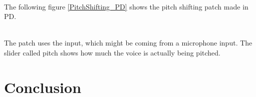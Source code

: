 \begin{minipage}{\linewidth}%
\label{HarmPatch}
\end{minipage}\\


The following figure \ref{PitchShifting_PD} shows the pitch shifting patch made in PD. \\


\begin{minipage}{\linewidth}%
\label{PitchShifting_PD}
\end{minipage}\\

The patch uses the input, which might be coming from a microphone input. The slider called pitch shows how much the voice is actually being pitched. 

\section{Conclusion}

